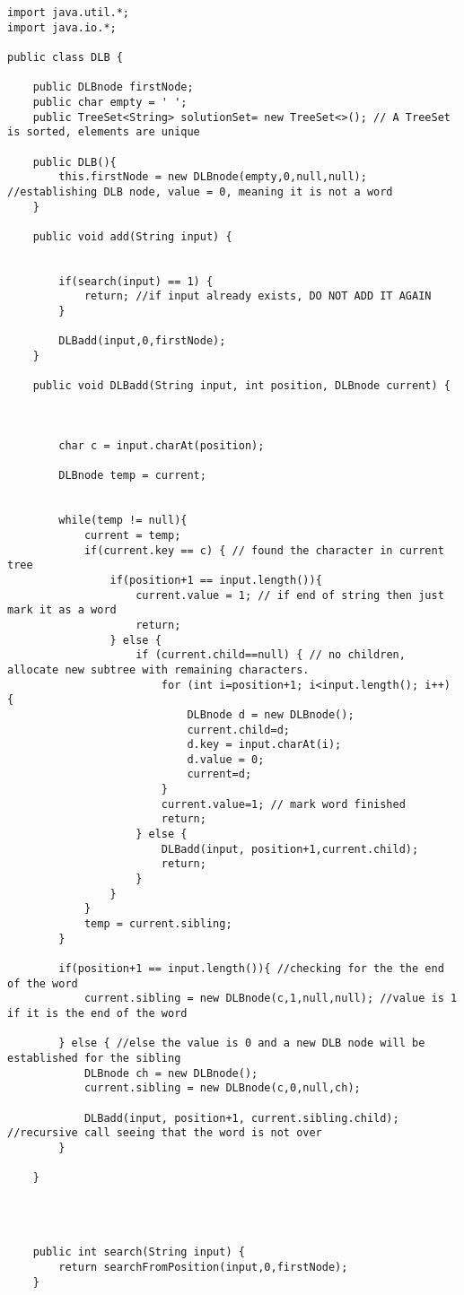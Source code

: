 \documentclass{article}
\begin{document}
\begin{lstlisting}
import java.util.*;
import java.io.*;

public class DLB {

	public DLBnode firstNode;
	public char empty = ' ';
    public TreeSet<String> solutionSet= new TreeSet<>(); // A TreeSet is sorted, elements are unique
	
	public DLB(){
		this.firstNode = new DLBnode(empty,0,null,null); //establishing DLB node, value = 0, meaning it is not a word
	}

	public void add(String input) {


		if(search(input) == 1) {
			return; //if input already exists, DO NOT ADD IT AGAIN
		}

		DLBadd(input,0,firstNode);
	}

	public void DLBadd(String input, int position, DLBnode current) {



		char c = input.charAt(position);

		DLBnode temp = current;


		while(temp != null){
			current = temp;
			if(current.key == c) { // found the character in current tree
				if(position+1 == input.length()){
					current.value = 1; // if end of string then just mark it as a word
					return;
				} else {
					if (current.child==null) { // no children, allocate new subtree with remaining characters.
						for (int i=position+1; i<input.length(); i++) {
							DLBnode d = new DLBnode();
							current.child=d;
							d.key = input.charAt(i);
							d.value = 0;
							current=d;
						}
						current.value=1; // mark word finished
						return;
					} else {
						DLBadd(input, position+1,current.child);
						return;
					}
				}
			}
			temp = current.sibling;
		}

		if(position+1 == input.length()){ //checking for the the end of the word
			current.sibling = new DLBnode(c,1,null,null); //value is 1 if it is the end of the word

		} else { //else the value is 0 and a new DLB node will be established for the sibling
			DLBnode ch = new DLBnode();
			current.sibling = new DLBnode(c,0,null,ch);

			DLBadd(input, position+1, current.sibling.child); //recursive call seeing that the word is not over
		}

	}




	public int search(String input) {
		return searchFromPosition(input,0,firstNode);
	}


\end{lstlisting}
\end{document}
